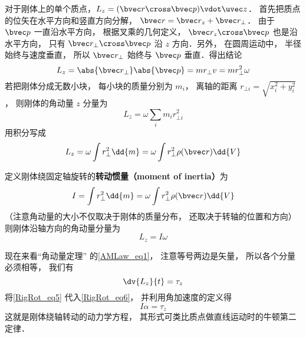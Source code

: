 对于刚体上的单个质点，$L_z = ( \bvec r \cross \bvec p ) \vdot \uvec z$． 首先把质点的位矢在水平方向和竖直方向分解， $\bvec r = \bvec r_z + \bvec r_ \bot$． 由于 $\bvec p$ 一直沿水平方向， 根据叉乘的几何定义， $\bvec r_z \cross \bvec p$ 也是沿水平方向， 只有 $\bvec r_ \bot \cross \bvec p$ 沿 $z$ 方向．另外， 在圆周运动中， 半径始终与速度垂直， 所以 $\bvec r_ \bot$ 始终与 $\bvec p$ 垂直．得出结论
\begin{equation}
L_z = \abs{\bvec r_\bot} \abs{\bvec p} = m r_ \bot v = mr_ \bot ^2\omega 
\end{equation}
若把刚体分成无数小块， 每小块的质量分别为 $m_i$， 离轴的距离 $r_{\bot i} = \sqrt{x_i^2 + y_i^2} $， 则刚体的角动量 $z$ 分量为
\begin{equation}
L_z = \omega \sum_i m_i r_{ \bot i}^2
\end{equation}
用积分写成
\begin{equation}
L_z = \omega \int r_ \bot ^2 \dd{m} = \omega \int r_ \bot ^2\rho(\bvec r)  \dd{V} 
\end{equation}

定义刚体绕固定轴旋转的\textbf{转动惯量（moment of inertia）}为
\begin{equation}
I = \int r_ \bot ^2 \dd{m} = \omega \int r_ \bot ^2\rho(\bvec r) \dd{V} 
\end{equation}
（注意角动量的大小不仅取决于刚体的质量分布， 还取决于转轴的位置和方向）则刚体沿轴方向的角动量分量为
\begin{equation}\label{RigRot_eq5}
L_z = I \omega 
\end{equation}

现在来看“角动量定理” 的\autoref{AMLaw_eq1}， 注意等号两边是矢量， 所以各个分量必须相等， 我们有
\begin{equation}\label{RigRot_eq6}
\dv{L_z}{t} = \tau_z
\end{equation}
将\autoref{RigRot_eq5} 代入\autoref{RigRot_eq6}， 并利用角加速度的定义得
\begin{equation}\label{RigRot_eq7}
I\alpha = \tau_z
\end{equation}
这就是刚体绕轴转动的动力学方程， 其形式可类比质点做直线运动时的牛顿第二定律．


